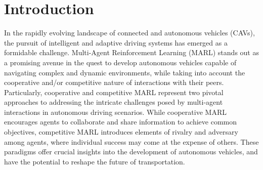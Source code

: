 \documentclass[letterpaper, 10 pt, conference]{ieeeconf}  %
\begin{document}
	
	\section{Introduction}
	\label{Section: Introduction}
	
	In the rapidly evolving landscape of connected and autonomous vehicles (CAVs), the pursuit of intelligent and adaptive driving systems has emerged as a formidable challenge. Multi-Agent Reinforcement Learning (MARL) stands out as a promising avenue in the quest to develop autonomous vehicles capable of navigating complex and dynamic environments, while taking into account the cooperative and/or competitive nature of interactions with their peers. Particularly, cooperative and competitive MARL represent two pivotal approaches to addressing the intricate challenges posed by multi-agent interactions in autonomous driving scenarios. While cooperative MARL encourages agents to collaborate and share information to achieve common objectives, competitive MARL introduces elements of rivalry and adversary among agents, where individual success may come at the expense of others. These paradigms offer crucial insights into the development of autonomous vehicles, and have the potential to reshape the future of transportation.
	
\end{document}
